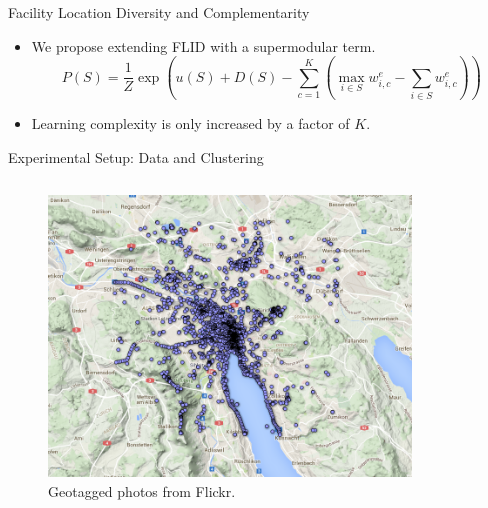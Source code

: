 \documentclass{beamer}
\begin{document}
\begin{frame}{Facility Location Diversity and Complementarity}
  \begin{itemize}
    \item We propose extending FLID with a supermodular term.
      \begin{equation*}
        P(S) = \frac{1}{Z}\exp{\left(u(S) + D(S) - \sum_{c=1}^{K}\left(\max_{i \in S}{w^{e}_{i,c}} - \sum_{i \in S}w^{e}_{i,c}\right)\right)}
      \end{equation*}
   \item Learning complexity is only increased by a factor of $K$.
  \end{itemize}
\end{frame}

\begin{frame}{Experimental Setup: Data and Clustering}
  \begin{columns}
    \begin{column}{0.45\textwidth}
      \begin{figure}
        \centering
        \includegraphics[width=\textwidth]{zurich_feature_map_2015}
        \caption{Geotagged photos from Flickr.}
      \end{figure}
    \end{column}
    \begin{column}{0.45\textwidth}
      \begin{figure}
        \centering

\end{figure}
\end{column}
\end{columns}
\end{frame}
\end{document}
